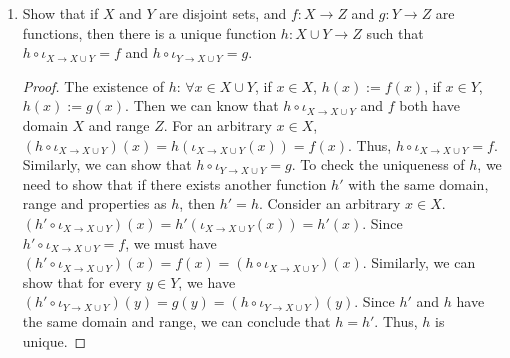 \documentclass[12pt, letter]{article}
\begin{document}
\begin{enumerate}
\begin{enumerate}
        \begin{proof}
            $f:A\to B$, $f^{-1}\circ f: B\to A$. So $f^{-1}\circ f$ and $\iota_{A\to A}$ have the same domain and range. Consider an arbitrary $x\in A$. $\iota_{A\to A}(x)=x$. Let $f(x)=y$. By definition of inverse, $f^{-1}(y)=x$. So $(f^{-1}\circ f)(x)=f^{-1}(f(x))=f^{-1}(y)=x=\iota_{A\to A}(x)$. Thus, 
            $f^{-1}\circ f=\iota_{A\to A}$.
        \end{proof}
    \end{enumerate}
    \item Show that if $X$ and $Y$ are disjoint sets, and $f:X\to Z$ and $g:Y\to Z$ are functions, then there is a unique function $h:X\cup Y\to Z$ such that 
    $h\circ\iota_{X\to X\cup Y}=f$ and $h\circ\iota_{Y\to X\cup Y}=g$.
    \begin{proof}
        The existence of $h$: $\forall x\in X\cup Y$, if $x\in X$, $h(x):=f(x)$, if $x\in Y$, $h(x):=g(x)$. 
        Then we can know that $h\circ\iota_{X\to X\cup Y}$ and $f$ both have domain $X$ and range $Z$. For an arbitrary $x\in X$, 
        $(h\circ\iota_{X\to X\cup Y})(x)=h(\iota_{X\to X\cup Y}(x))=f(x)$. Thus, $h\circ\iota_{X\to X\cup Y}=f$. Similarly, we can show that 
        $h\circ\iota_{Y\to X\cup Y}=g$. To check the uniqueness of $h$, we need to show that if there exists another function $h'$ with the same domain, range and properties as $h$, then $h'=h$. 
        Consider an arbitrary $x\in X$. $(h'\circ\iota_{X\to X\cup Y})(x)=h'(\iota_{X\to X\cup Y}(x))=h'(x)$. Since $h'\circ\iota_{X\to X\cup Y}=f$, we must have $(h'\circ\iota_{X\to X\cup Y})(x)=f(x)=(h\circ\iota_{X\to X\cup Y})(x)$. 
        Similarly, we can show that for every $y\in Y$, we have $(h'\circ\iota_{Y\to X\cup Y})(y)=g(y)=(h\circ\iota_{Y\to X\cup Y})(y)$. Since $h'$ and $h$ have the same domain and range, we can conclude that $h=h'$. Thus, $h$ is unique.
    \end{proof}
\end{enumerate}
\end{document}
